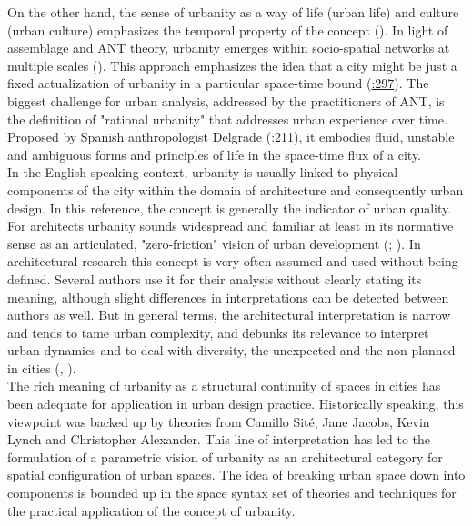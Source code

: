 \documentclass[11pt]{report}
\begin{document}
{{{On the other hand, the sense of urbanity as a way of life (urban life) and culture (urban culture) emphasizes the temporal property of the concept (\href{Farias}{\citealt{farias_introduction:_2011}}).
In light of assemblage and ANT theory, urbanity emerges within socio-spatial networks at multiple scales (\href{Kamalipour}{\citealt{kamalipour_assemblage_2015}}).
This approach emphasizes the idea that a city might be just a fixed actualization of urbanity in a particular space-time bound (\href{Farias}{\citealt{farias_introduction:_2011}:297}).
The biggest challenge for urban analysis, addressed by the practitioners of ANT, is the definition of "rational urbanity" that addresses urban experience over time.
Proposed by Spanish anthropologist Delgrade (\citealt{farias_introduction:_2011}:211), it embodies fluid, unstable and ambiguous forms and principles of life in the space-time flux of a city.
\\

In the English speaking context, urbanity is usually linked to physical components of the city within the domain of architecture and consequently urban design.
In this reference, the concept is generally the indicator of urban quality. For architects urbanity sounds widespread and familiar at least in its normative sense as an articulated, "zero-friction" vision of urban development (\href{ref}{\citealt{hajer_zero-friction_1999}}; \href{wust}{\citealt{wust_urbanity_2005}}).
In architectural research this concept is very often assumed and used without being defined.
Several authors use it for their analysis without clearly stating its meaning, although slight differences in interpretations can be detected between authors as well.
But in general terms, the architectural interpretation is narrow and tends to tame urban complexity, and debunks its relevance to interpret urban dynamics  and to deal with diversity, the unexpected and the non-planned in cities (\href{Groth}{\citealt{groth_reclaiming_2005}}, \href{Wuest}{\citealt{wust_urbanity_2005}}). 
\\

The rich meaning of urbanity as a structural continuity of spaces in cities has been adequate for application in urban design practice. Historically speaking, this viewpoint was backed up by theories from Camillo Sité, Jane Jacobs, Kevin Lynch and Christopher Alexander.
This line of interpretation has led to the formulation of a parametric vision of urbanity as an architectural category for spatial configuration of urban spaces.
The idea of breaking urban space down into components is bounded up in the space syntax set of theories and techniques for the practical application of the concept of urbanity.
\\

}}}
\end{document}
